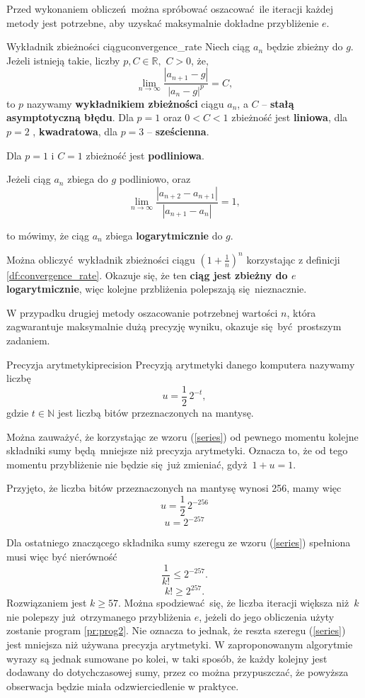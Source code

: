 \documentclass[12pt]{article}
\begin{document}
Przed wykonaniem obliczeń można spróbować oszacować ile iteracji każdej
metody jest potrzebne, aby uzyskać maksymalnie dokładne przybliżenie $e$.

\begin{defn}{Wykładnik zbieżności ciągu}{convergence_rate}
    Niech ciąg $a_n$ będzie zbieżny do $g$. Jeżeli istnieją takie,
    liczby $p, C \in \mathds{R},\,\, C > 0$, że,
    \large$$\lim\limits_{n \to \infty}{\frac{|a_{n+1} - g|}{|a_n - g|^p}} = C,$$\normalsize
    to $p$ nazywamy \textbf{wykładnikiem zbieżności} ciągu $a_n$, a $C$ -- \textbf{stałą asymptotyczną błędu}.
    Dla $p = 1$ oraz $0 < C < 1$ zbieżność jest \textbf{liniowa}, dla $p = 2$ ,
    \textbf{kwadratowa}, dla $p = 3$ -- \textbf{sześcienna}.
    
    Dla $p = 1$ i $C = 1$ zbieżność jest \textbf{podliniowa}.

    Jeżeli ciąg $a_n$ zbiega do $g$ podliniowo, oraz
    $$\lim\limits_{n \to \infty}{\frac{|a_{n+2} - a_{n+1}|}{|a_{n+1} - a_n|}} = 1,$$

    to mówimy, że ciąg $a_n$ zbiega \textbf{logarytmicznie} do $g$.
\end{defn}

Można obliczyć wykładnik zbieżności ciągu $(1+\frac{1}{n})^n$ korzystając z definicji
\ref{df:convergence_rate}. Okazuje się, że ten \textbf{ciąg jest zbieżny do $e$ logarytmicznie},
więc kolejne przbliżenia polepszają się nieznacznie. \newline

W przypadku drugiej metody oszacowanie potrzebnej wartości $n$, która zagwarantuje
maksymalnie dużą precyzję wyniku, okazuje się być prostszym zadaniem.

\begin{defn}{Precyzja arytmetyki}{precision}
    Precyzją arytmetyki danego komputera nazywamy liczbę
    \large$$ u = \frac{1}{2}\, 2^{-t},$$\normalsize
    gdzie $t \in \mathds{N}$ jest liczbą bitów przeznaczonych na mantysę.
\end{defn}

Można zauważyć, że korzystając ze wzoru (\ref{series}) od pewnego momentu kolejne
składniki sumy będą mniejsze niż precyzja arytmetyki. Oznacza to, że 
od tego momentu przybliżenie nie będzie się już zmieniać, gdyż $1 + u = 1$.

Przyjęto, że liczba bitów przeznaczonych na mantysę wynosi 256, mamy więc
$$u = \frac{1}{2}\,2^{-256}$$
$$u = 2^{-257}$$

Dla ostatniego znaczącego składnika sumy szeregu ze wzoru (\ref{series}) spełniona 
musi więc być nierówność
$$\frac{1}{k!} \leq 2^{-257}.$$
$$k! \geq 2^{257}.$$
Rozwiązaniem jest $k \geq 57$. Można spodziewać się, że liczba iteracji
większa niż $k$ nie polepszy już otrzymanego przybliżenia $e$, jeżeli do jego
obliczenia użyty zostanie program \ref{pr:prog2}. Nie oznacza to jednak, że reszta
szeregu (\ref{series}) jest mniejsza niż używana precyzja arytmetyki. 
W zaproponowanym algorytmie wyrazy są jednak sumowane po kolei, w taki sposób, że
każdy kolejny jest dodawany do dotychczasowej sumy, przez co można przypuszczać, że
powyższa obserwacja będzie miała odzwierciedlenie w praktyce.
\end{document}
